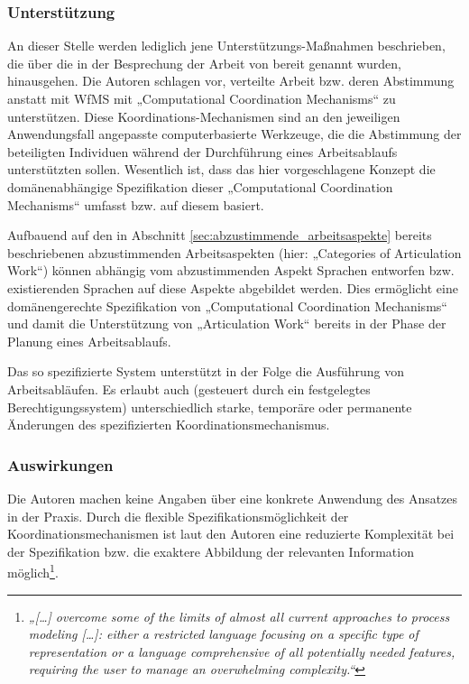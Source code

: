 \subsubsection{Unterstützung}

An dieser Stelle werden lediglich jene Unterstützungs-Maßnahmen beschrieben, die über die in der Besprechung der Arbeit von \citet{Schmidt96} bereit genannt wurden, hinausgehen. Die Autoren schlagen vor, verteilte Arbeit bzw. deren Abstimmung anstatt mit \gls{WfMS} mit „Computational Coordination Mechanisms“ zu unterstützen. Diese Koordinations-Mechanismen sind an den jeweiligen Anwendungsfall angepasste computerbasierte Werkzeuge, die die Abstimmung der beteiligten Individuen während der Durchführung eines Arbeitsablaufs unterstützten sollen. Wesentlich ist, dass das hier vorgeschlagene Konzept die domänenabhängige Spezifikation dieser „Computational Coordination Mechanisms“ umfasst bzw. auf diesem basiert. 

Aufbauend auf den in Abschnitt \ref{sec:abzustimmende_arbeitsaspekte} bereits beschriebenen abzustimmenden Arbeitsaspekten (hier: „Categories of Articulation Work“) können abhängig vom abzustimmenden Aspekt Sprachen entworfen bzw. existierenden Sprachen auf diese Aspekte abgebildet werden. Dies ermöglicht eine domänengerechte Spezifikation von „Computational Coordination Mechanisms“ und damit die Unterstützung von „Articulation Work“ bereits in der Phase der Planung eines Arbeitsablaufs. 

Das so spezifizierte System unterstützt in der Folge die Ausführung von Arbeitsabläufen. Es erlaubt auch (gesteuert durch ein festgelegtes Berechtigungssystem) unterschiedlich starke, temporäre oder permanente Änderungen des spezifizierten Koordinationsmechanismus.

\subsubsection{Auswirkungen}

Die Autoren machen keine Angaben über eine konkrete Anwendung des Ansatzes in der Praxis. Durch die flexible Spezifikationsmöglichkeit der Koordinationsmechanismen ist laut den Autoren eine reduzierte Komplexität bei der Spezifikation bzw. die exaktere Abbildung der relevanten Information möglich\footnote{\emph{„[\ldots] overcome some of the limits of 
almost all current approaches to process modeling [\ldots]: either a restricted language focusing on a speciﬁc type of representation or a language comprehensive of all potentially needed features, requiring the user to manage an overwhelming complexity.“}\citep[][S. 377]{Divitini00}}.

